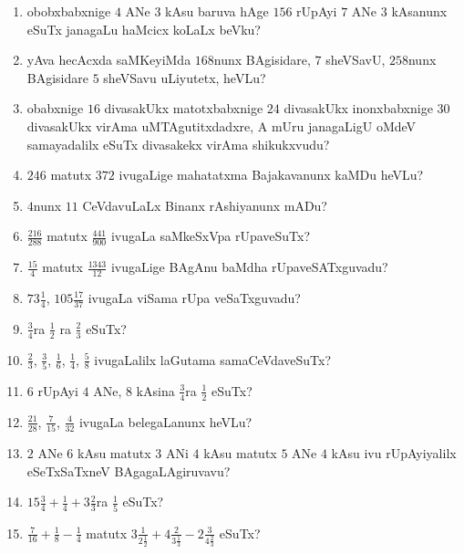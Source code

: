 \begin{enumerate}
\item obobxbabxnige $4$ ANe $3$ kAsu baruva hAge $156$ rUpAyi $7$ ANe
$3$ kAsanunx eSuTx janagaLu haMcicx koLaLx beVku?

\item yAva hecAcxda saMKeyiMda $168$nunx BAgisidare, $7$ sheVSavU,
$258$nunx BAgisidare $5$ sheVSavu uLiyutetx, heVLu?

\item obabxnige $16$ divasakUkx matotxbabxnige $24$ divasakUkx
inonxbabxnige $30$ divasakUkx virAma uMTAgutitxdadxre, A mUru
janagaLigU oMdeV samayadalilx eSuTx divasakekx virAma shikukxvudu?

\item $246$ matutx $372$ ivugaLige mahatatxma Bajakavanunx kaMDu
heVLu?

\item $4$nunx $11$ CeVdavuLaLx Binanx rAshiyanunx mADu?

\item $\frac{216}{288}$  matutx $\frac{441}{900}$ ivugaLa saMkeSxVpa
rUpaveSuTx?

\item $\frac{15}{4}$ matutx $\frac{1343}{12}$ ivugaLige BAgAnu baMdha
rUpaveSATxguvadu? 

\item $73 \frac{1}{4}$, $105 \frac{17}{37}$ ivugaLa viSama rUpa
veSaTxguvadu?

\item $\frac{3}{4}$ra $\frac{1}{2}$ ra $\frac{2}{3}$ eSuTx?

\item $\frac{2}{3}$, $\frac{3}{5}$, $\frac{1}{6}$, $\frac{1}{4}$,
$\frac{5}{8}$ ivugaLalilx laGutama samaCeVdaveSuTx?

\item $6$ rUpAyi $4$ ANe, $8$ kAsina $\frac{3}{4}$ra $\frac{1}{2}$
eSuTx?

\item $\frac{21}{28}$, $\frac{7}{15}$, $\frac{4}{32}$ ivugaLa
belegaLanunx heVLu?

\item $2$ ANe $6$ kAsu matutx $3$ ANi $4$ kAsu matutx $5$ ANe $4$ kAsu
ivu rUpAyiyalilx eSeTxSaTxneV BAgagaLAgiruvavu?

\item $15\frac{3}{4}+ \frac{1}{4} + 3\frac{2}{3}$ra $\frac{1}{5}$
eSuTx?
\item $\frac{7}{16} + \frac{1}{8} - \frac{1}{4}$ matutx
$3 \frac{1}{2 \frac{1}{2}} + 4 \frac{2}{3 \frac{1}{3}} -
2 \frac{3}{4 \frac{2}{3}}$ eSuTx?


\end{enumerate}
